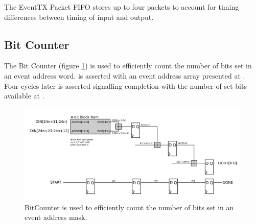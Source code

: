 The EventTX Packet FIFO stores up to four packets to account for
timing differences between timing of input and output. 


\subsection{Bit Counter}
The Bit Counter (figure \ref{bitcounter}) is used to efficiently count
the number of bits set in an event address word.  is
asserted with an event address array presented at .
Four cycles later  is asserted signalling completion with
the number of set bits available at .


\begin{figure}
\begin{centering}
\includegraphics[scale=0.8]{bitcnt.svg}
\end{centering}
\caption{BitCounter is used to efficiently count the number of bits set in an event address mask.}
\label{bitcounter}
\end{figure}

